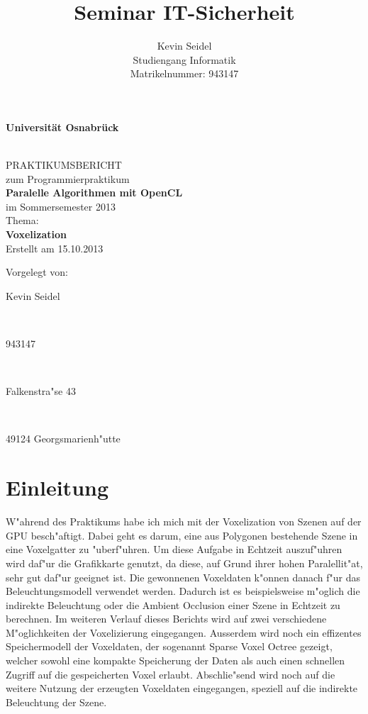 \documentclass[a4paper, 12pt]{scrartcl}
\title{Seminar IT-Sicherheit}
\author{Kevin Seidel \\ Studiengang Informatik \\ Matrikelnummer: 943147}
\begin{document}
\begin{titlepage}
\begin{center}
\vspace*{1.5cm}
\begin{Large}
\textbf{Universität Osnabrück}
\end{Large}

\noindent\hrulefill
\\[3.5cm]
PRAKTIKUMSBERICHT \\[1cm]
zum Programmierpraktikum \\[1cm]
\textbf{Paralelle Algorithmen mit OpenCL} \\[1.5cm]
im Sommersemester 2013 \\[1.5cm]
Thema: \\[0.5cm]
\textbf{Voxelization} \\[2cm]
Erstellt am 15.10.2013
\end{center}
\vfill
\begin{flushleft}
Vorgelegt von: 
\hfill \parbox{46mm}{Kevin Seidel} \\
\hfill \parbox{46mm}{943147} \\
\hfill \parbox{46mm}{Falkenstra"se 43} \\
\hfill \parbox{46mm}{49124 Georgsmarienh"utte}
\end{flushleft}
\end{titlepage}

\newpage

\setcounter{page}{2}
\tableofcontents

\newpage
{}
\setcounter{page}{1}

\section{Einleitung}
W"ahrend des Praktikums habe ich mich mit der Voxelization von Szenen auf der GPU besch"aftigt. Dabei geht es darum, eine aus Polygonen bestehende Szene in eine Voxelgatter zu "uberf"uhren. Um diese Aufgabe in Echtzeit auszuf"uhren wird daf"ur die Grafikkarte genutzt, da diese, auf Grund ihrer hohen Paralellit"at, sehr gut daf"ur geeignet ist.
Die gewonnenen Voxeldaten k"onnen danach f"ur das Beleuchtungsmodell verwendet werden. Dadurch ist es beispielsweise m"oglich die indirekte Beleuchtung oder die Ambient Occlusion einer Szene in Echtzeit zu berechnen.
Im weiteren Verlauf dieses Berichts wird auf zwei verschiedene M"oglichkeiten der Voxelizierung eingegangen. Ausserdem wird noch ein effizentes Speichermodell der Voxeldaten, der sogenannt Sparse Voxel Octree gezeigt, welcher sowohl eine kompakte Speicherung der Daten als auch einen schnellen Zugriff auf die gespeicherten Voxel erlaubt. 
Abschlie"send wird noch auf die weitere Nutzung der erzeugten Voxeldaten eingegangen, speziell auf die indirekte Beleuchtung der Szene.
\end{document}
